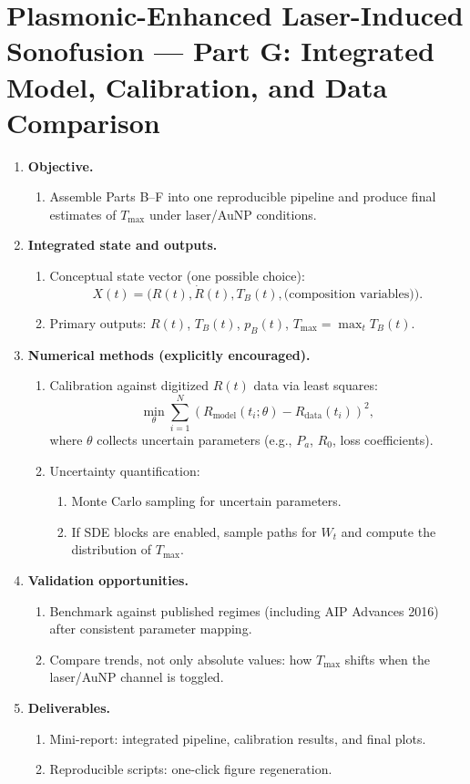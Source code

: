 \documentclass[11pt]{article}
\begin{document}
	\section{Plasmonic-Enhanced Laser-Induced Sonofusion --- Part G: Integrated Model, Calibration, and Data Comparison}
	\begin{enumerate}
		\item \textbf{Objective.}
		\begin{enumerate}
			\item Assemble Parts B--F into one reproducible pipeline and produce final estimates of $T_{\max}$ under laser/AuNP conditions.
		\end{enumerate}
		
		\item \textbf{Integrated state and outputs.}
		\begin{enumerate}
			\item Conceptual state vector (one possible choice):
			\[
			X(t)=\bigl(R(t),\dot R(t),T_B(t),\text{(composition variables)}\bigr).
			\]
			\item Primary outputs: $R(t)$, $T_B(t)$, $p_B(t)$, $T_{\max}=\max_t T_B(t)$.
		\end{enumerate}
		
		\item \textbf{Numerical methods (explicitly encouraged).}
		\begin{enumerate}
			\item Calibration against digitized $R(t)$ data via least squares:
			\[
			\min_{\theta}\sum_{i=1}^{N}\left(R_{\mathrm{model}}(t_i;\theta)-R_{\mathrm{data}}(t_i)\right)^2,
			\]
			where $\theta$ collects uncertain parameters (e.g., $P_a$, $R_0$, loss coefficients).
			\item Uncertainty quantification:
			\begin{enumerate}
				\item Monte Carlo sampling for uncertain parameters.
				\item If SDE blocks are enabled, sample paths for $W_t$ and compute the distribution of $T_{\max}$.
			\end{enumerate}
		\end{enumerate}
		
		\item \textbf{Validation opportunities.}
		\begin{enumerate}
			\item Benchmark against published regimes (including AIP Advances 2016) after consistent parameter mapping.
			\item Compare trends, not only absolute values: how $T_{\max}$ shifts when the laser/AuNP channel is toggled.
		\end{enumerate}
		
		\item \textbf{Deliverables.}
		\begin{enumerate}
			\item Mini-report: integrated pipeline, calibration results, and final plots.
			\item Reproducible scripts: one-click figure regeneration.
		\end{enumerate}
	\end{enumerate}
	
\end{document}
